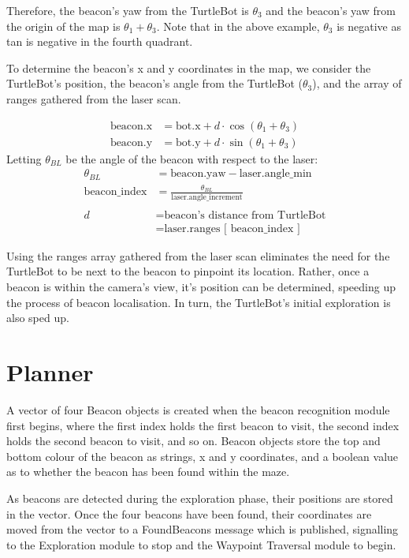 \documentclass[titlepage,12pt,a4paper]{article}
\begin{document}
Therefore, the beacon's yaw from the TurtleBot is $\theta_3$ and the beacon's yaw from the origin of the map is $\theta_1 + \theta_3$. Note that in the above example, $\theta_3$ is negative as tan is negative in the fourth quadrant.

To determine the beacon's x and y coordinates in the map, we consider the TurtleBot's position, the beacon's angle from the TurtleBot ($\theta_3$), and the array of ranges gathered from the laser scan. 

\begin{align*}
	\text{beacon.x}		&=		\text{bot.x} + d \cdot \cos{(\theta_1 + \theta_3)} \\
	\text{beacon.y} 		&= 		\text{bot.y} + d \cdot \sin{(\theta_1 + \theta_3)} 
\end{align*}
Letting $\theta_{BL}$ be the angle of the beacon with respect to the laser: 
\begin{align*}
		\theta_{BL}	&= 		\text{beacon.yaw} - \text{laser.angle\_min} \\
   \text{beacon\_index}	&=		\frac{\theta_{BL}}{\text{laser.angle\_increment}} \\
   					 \\
				d 	&=		\text{beacon's distance from TurtleBot} \\
					&=		\text{laser.ranges [ beacon\_index ]} 
\end{align*}

Using the ranges array gathered from the laser scan eliminates the need for the TurtleBot to be next to the beacon to pinpoint its location. Rather, once a beacon is within the camera's view, it's position can be determined, speeding up the process of beacon localisation. In turn, the TurtleBot's initial exploration is also sped up.

\pagebreak
\section{Planner}

A vector of four Beacon objects is created when the beacon recognition module first begins, where the first index holds the first beacon to visit, the second index holds the second beacon to visit, and so on. Beacon objects store the top and bottom colour of the beacon as strings, x and y coordinates, and a boolean value as to whether the beacon has been found within the maze. 

As beacons are detected during the exploration phase, their positions are stored in the vector. Once the four beacons have been found, their coordinates are moved from the vector to a FoundBeacons message which is published, signalling to the Exploration module to stop and the Waypoint Traversal module to begin.
\end{document}

